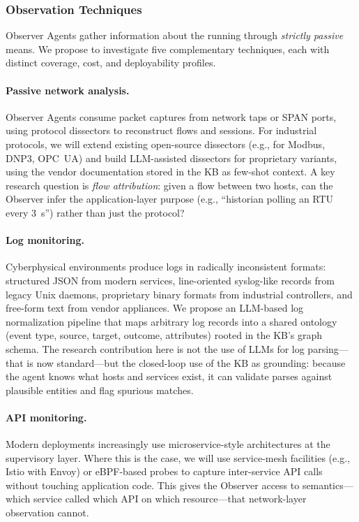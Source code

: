 \subsubsection{Observation Techniques}

Observer Agents gather information about the running \cps through
\emph{strictly passive} means. We propose to investigate five
complementary techniques, each with distinct coverage, cost, and
deployability profiles.

\paragraph{Passive network analysis.}
Observer Agents consume packet captures from network taps or SPAN
ports, using protocol dissectors to reconstruct flows and sessions.
For industrial protocols, we will extend existing open-source
dissectors (e.g., for Modbus, DNP3, OPC~UA) and build LLM-assisted
dissectors for proprietary variants, using the vendor documentation
stored in the KB as few-shot context. A key research question is
\emph{flow attribution}: given a flow between two hosts, can the
Observer infer the application-layer purpose (e.g., ``historian
polling an RTU every 3~s'') rather than just the protocol?

\paragraph{Log monitoring.}
Cyberphysical environments produce logs in radically inconsistent
formats: structured JSON from modern services, line-oriented
syslog-like records from legacy Unix daemons, proprietary binary
formats from industrial controllers, and free-form text from vendor
appliances. We propose an LLM-based log normalization pipeline that
maps arbitrary log records into a shared ontology (event type,
source, target, outcome, attributes) rooted in the KB's graph schema.
The research contribution here is not the use of LLMs for
log parsing---that is now standard---but the closed-loop use of the KB
as grounding: because the agent knows what hosts and services exist,
it can validate parses against plausible entities and flag spurious
matches.

\paragraph{API monitoring.}
Modern \cps deployments increasingly use microservice-style
architectures at the supervisory layer. Where this is the case, we
will use service-mesh facilities (e.g., Istio with Envoy) or eBPF-based
probes to capture inter-service API calls without touching application
code. This gives the Observer access to semantics---which service
called which API on which resource---that network-layer observation
cannot.

